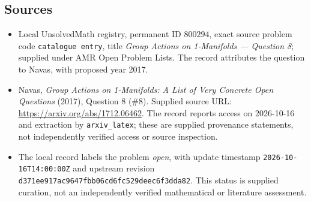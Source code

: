 \documentclass[11pt]{article}
\begin{document}
\subsection{Sources}
\begin{itemize}
\item Local UnsolvedMath registry, permanent ID \(800294\), exact source problem code \texttt{catalogue entry}, title \emph{Group Actions on 1-Manifolds --- Question 8}; supplied under AMR Open Problem Lists. The record attributes the question to Navas, with proposed year 2017.
\item Navas, \emph{Group Actions on 1-Manifolds: A List of Very Concrete Open Questions} (2017), Question 8 (\#8). Supplied source URL: \url{https://arxiv.org/abs/1712.06462}. The record reports access on 2026-10-16 and extraction by \texttt{arxiv\_latex}; these are supplied provenance statements, not independently verified access or source inspection.
\item The local record labels the problem \emph{open}, with update timestamp \texttt{2026-10-16T14:00:00Z} and upstream revision \texttt{d371ee917ac9647fbb06cd6fc529deec6f3dda82}. This status is supplied curation, not an independently verified mathematical or literature assessment.
\end{itemize}
\end{document}
